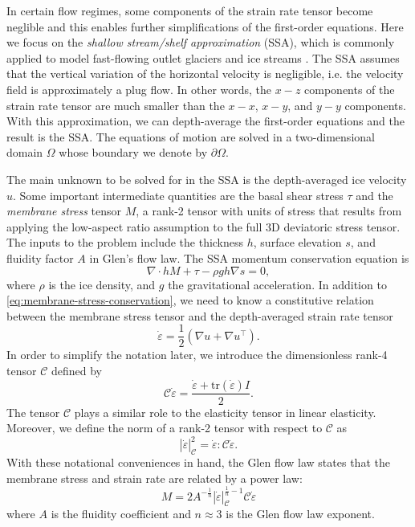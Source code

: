 \documentclass{article}
\theoremstyle{definition}
\theoremstyle{plain}
\begin{document}
In certain flow regimes, some components of the strain rate tensor become neglible and this enables further simplifications of the first-order equations.
Here we focus on the \emph{shallow stream/shelf approximation} (SSA), which is commonly applied to model fast-flowing outlet glaciers and ice streams \citep{greve2009dynamics}.
The SSA assumes that the vertical variation of the horizontal velocity is negligible, i.e. the velocity field is approximately a plug flow.
In other words, the $x-z$ components of the strain rate tensor are much smaller than the $x-x$, $x-y$, and $y-y$ components.
With this approximation, we can depth-average the first-order equations and the result is the SSA.
The equations of motion are solved in a two-dimensional domain $\Omega$ whose boundary we denote by $\partial\Omega$.

The main unknown to be solved for in the SSA is the depth-averaged ice velocity $u$.
Some important intermediate quantities are the basal shear stress $\tau$ and the \emph{membrane stress} tensor $M$, a rank-2 tensor with units of stress that results from applying the low-aspect ratio assumption to the full 3D deviatoric stress tensor.
The inputs to the problem include the thickness $h$, surface elevation $s$, and fluidity factor $A$ in Glen's flow law.
The SSA momentum conservation equation is
\begin{equation}
    \nabla\cdot hM + \tau - \rho gh\nabla s = 0,
    \label{eq:membrane-stress-conservation}
\end{equation}
where $\rho$ is the ice density, and $g$ the gravitational acceleration.
In addition to \eqref{eq:membrane-stress-conservation}, we need to know a constitutive relation between the membrane stress tensor and the depth-averaged strain rate tensor
\begin{equation}
    \dot\varepsilon = \frac{1}{2}\left(\nabla u + \nabla u^\top\right).
    \label{eq:strain-rate}
\end{equation}
In order to simplify the notation later, we introduce the dimensionless rank-4 tensor $\mathscr{C}$ defined by
\begin{equation}
    \mathscr{C}\dot\varepsilon = \frac{\dot\varepsilon + \text{tr}(\dot\varepsilon)I}{2}.
    \label{eq:elasticity-tensor}
\end{equation}
The tensor $\mathscr{C}$ plays a similar role to the elasticity tensor in linear elasticity.
Moreover, we define the norm of a rank-2 tensor with respect to $\mathscr{C}$ as
\begin{equation}
    |\dot\varepsilon|_{\mathscr{C}}^2 = \dot\varepsilon : \mathscr{C}\dot\varepsilon.
\end{equation}
With these notational conveniences in hand, the Glen flow law states that the membrane stress and strain rate are related by a power law:
\begin{equation}
    M = 2A^{-\frac{1}{n}}|\dot\varepsilon|_{\mathscr C}^{\frac{1}{n} - 1}\mathscr{C}\dot\varepsilon
    \label{eq:constitutive-relation}
\end{equation}
where $A$ is the fluidity coefficient and $n \approx 3$ is the Glen flow law exponent.
\end{document}
